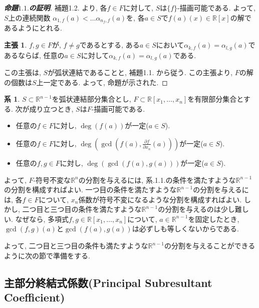 \documentclass[dvipdfmx,uplatex]{jsarticle}
\newcommand{\R}{\mathbb{R}}
\theoremstyle{definition}
\newtheorem{corollary}{系}[section]
\newtheorem*{claim*}{主張}
\begin{document}
\begin{proof}[{\bf 命題$1.1.$の証明}]

補題1.2. より, 各$f \in F$に対して, $S$は$\{f\}$-描画可能である.
よって,$S$上の連続関数 $\alpha_{1,f}(a) < \dots \alpha_{n_f, f}(a)$を, 各$a \in S$で$f(a)(x) \in \R[x]$の解であるようにとれる.

\begin{claim*}
$f, g \in F$が, $f \neq g$であるとする,
ある$a \in S$において$\alpha_{k,f}(a) = \alpha_{l,g}(a)$であるならば, 任意の$a \in S$に対して$\alpha_{k,f}(a) = \alpha_{l,g}(a)$である.
\end{claim*}

この主張は, $S$が弧状連結であることと, 補題1.1. から従う. 
この主張より, $F$の解の個数は$S$上一定である. よって, 命題が示された.
\end{proof}

\begin{corollary}
$S \subset \R^{n-1}$を弧状連結部分集合とし, $F \subset \R[x_1,\dots, x_n]$を有限部分集合とする.
次が成り立つとき, $S$は$F$-描画可能である.
\begin{itemize}
\item 任意の$f \in F$に対し, $\deg(f(a))$が一定($a \in S$).
\item 任意の$f \in F$に対し, $\deg(\gcd(f(a), \frac{\partial f}{\partial x_n}(a)))$が一定($a \in S$).
\item 任意の$f, g \in F$に対し, $\deg(\gcd(f(a), g(a)))$が一定($a \in S$).
\end{itemize}
\end{corollary}

よって, $F$-符号不変な$\R^n$の分割を与えるには, 系.1.1.の条件を満たすような$\R^{n-1}$の分割を構成すればよい.
一つ目の条件を満たすような$\R^{n-1}$の分割を与えるには, 各$f \in F$について, $x_n$係数が符号不変になるような分割を構成すればよい.
しかし, 二つ目と三つ目の条件を満たすような$\R^{n-1}$の分割を与えるのは少し難しい. 
なぜなら, 多項式$f, g \in \R[x_1, \dots, x_n]$について, $a \in \R^{n-1}$を固定したとき, $\gcd(f,g)(a)$と$\gcd(f(a),g(a))$は必ずしも等しくないからである.

よって, 二つ目と三つ目の条件も満たすような$\R^{n-1}$の分割を与えることができるように次の節で準備をする.



\subsection{主部分終結式係数(Principal Subresultant Coefficient)}
\end{document}
